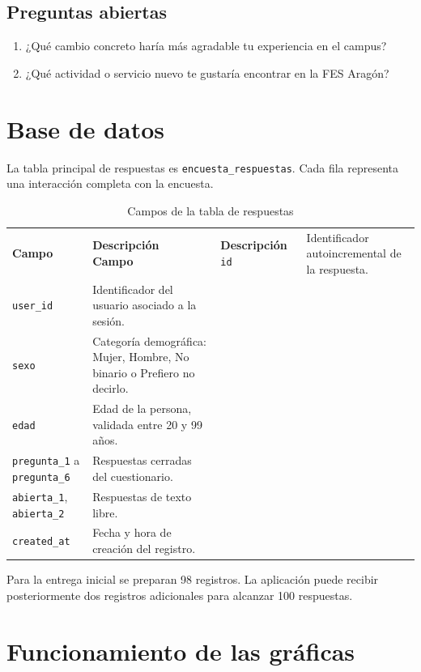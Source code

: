 \documentclass[12pt,letterpaper,oneside]{extreport}
\begin{document}
\section{Preguntas abiertas}

\begin{enumerate}[label=\arabic*.]
    \item ¿Qué cambio concreto haría más agradable tu experiencia en el campus?
    \item ¿Qué actividad o servicio nuevo te gustaría encontrar en la FES Aragón?
\end{enumerate}

\chapter{Base de datos}

La tabla principal de respuestas es \texttt{encuesta\_respuestas}. Cada fila representa una interacción completa con la encuesta.

\begin{longtable}{p{}p{}}
\caption{Campos de la tabla de respuestas}\label{tab:bd}\\
\toprule
\textbf{Campo} & \textbf{Descripción}\
\midrule
\endfirsthead
\toprule
\textbf{Campo} & \textbf{Descripción}\
\midrule
\endhead
\texttt{id} & Identificador autoincremental de la respuesta.\\
\texttt{user\_id} & Identificador del usuario asociado a la sesión.\\
\texttt{sexo} & Categoría demográfica: Mujer, Hombre, No binario o Prefiero no decirlo.\\
\texttt{edad} & Edad de la persona, validada entre 20 y 99 años.\\
\texttt{pregunta\_1} a \texttt{pregunta\_6} & Respuestas cerradas del cuestionario.\\
\texttt{abierta\_1}, \texttt{abierta\_2} & Respuestas de texto libre.\\
\texttt{created\_at} & Fecha y hora de creación del registro.\\
\bottomrule
\end{longtable}

Para la entrega inicial se preparan 98 registros. La aplicación puede recibir posteriormente dos registros adicionales para alcanzar 100 respuestas.

\chapter{Funcionamiento de las gráficas}
\end{document}
